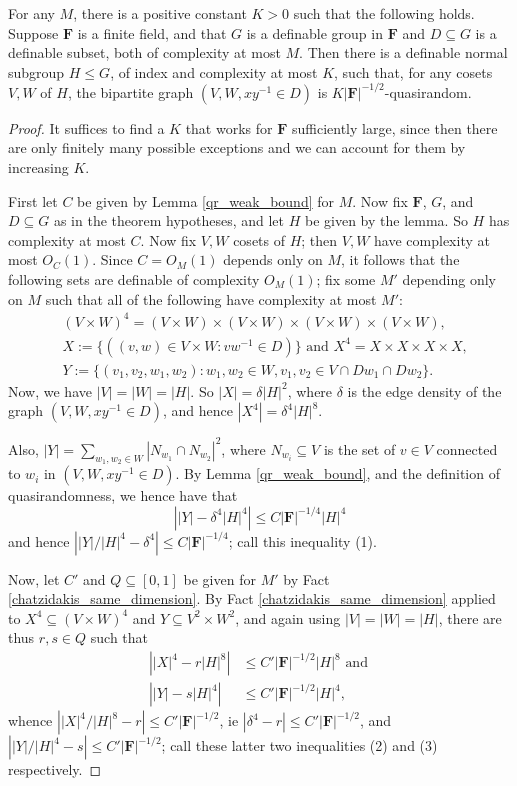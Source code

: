 \documentclass[10pt]{article}
\begin{document}
{\begin{theorem}\label{main_theorem}
    For any $M$, there is a positive constant $K>0$ such that the following holds. Suppose $\mathbf{F}$ is a finite field, and that $G$ is a definable group in $\mathbf{F}$ and $D\subseteq G$ is a definable subset, both of complexity at most $M$. Then there is a definable normal subgroup $H\leqslant G$, of index and complexity at most $K$, such that, for any cosets $V,W$ of $H$, the bipartite graph $(V,W,xy^{-1}\in D)$ is $K|\mathbf{F}|^{-1/2}$-quasirandom.
\end{theorem}
\begin{proof}
    It suffices to find a $K$ that works for $\mathbf{F}$ sufficiently large, since then there are only finitely many possible exceptions and we can account for them by increasing $K$.

    First let $C$ be given by Lemma \ref{qr_weak_bound} for $M$. Now fix $\mathbf{F}$, $G$, and $D\subseteq G$ as in the theorem hypotheses, and let $H$ be given by the lemma. So $H$ has complexity at most $C$. Now fix $V,W$ cosets of $H$; then $V,W$ have complexity at most $O_C(1)$. Since $C=O_M(1)$ depends only on $M$, it follows that the following sets are definable of complexity $O_M(1)$; fix some $M'$ depending only on $M$ such that all of the following have complexity at most $M'$:
    \begin{align*}
        &(V\times W)^4=(V\times W)\times (V\times W)\times (V\times W)\times (V\times W), \\
        &X:=\{((v,w)\in V\times W:vw^{-1}\in D)\}\text{ and }X^4=X\times X\times X\times X,\\
        &Y:=\{(v_1,v_2,w_1,w_2):w_1,w_2\in W,v_1,v_2\in V\cap Dw_1\cap Dw_2\}.
    \end{align*} Now, we have $|V|=|W|=|H|$. So $|X|=\delta|H|^2$, where $\delta$ is the edge density of the graph $(V,W,xy^{-1}\in D)$, and hence $|X^4|=\delta^4|H|^8$.
    
    Also, $|Y|=\sum_{w_1,w_2\in W}|N_{w_1}\cap N_{w_2}|^2$, where $N_{w_i}\subseteq V$ is the set of $v\in V$ connected to $w_i$ in $(V,W,xy^{-1}\in D)$. By Lemma \ref{qr_weak_bound}, and the definition of quasirandomness, we hence have that $$\left||Y|-\delta^4|H|^4\right|\leqslant C|\mathbf{F}|^{-1/4}|H|^4$$ and hence $\left||Y|/|H|^4-\delta^4\right|\leqslant C|\mathbf{F}|^{-1/4}$; call this inequality (1).

    Now, let $C'$ and $Q\subseteq[0,1]$ be given for $M'$ by Fact \ref{chatzidakis_same_dimension}. By Fact \ref{chatzidakis_same_dimension} applied to $X^4\subseteq (V\times W)^4$ and $Y\subseteq V^2\times W^2$, and again using $|V|=|W|=|H|$, there are thus $r,s\in Q$ such that \begin{align*}
        \left||X|^4-r|H|^8\right|&\leqslant C'|\mathbf{F}|^{-1/2}|H|^8\text{ and}\ \\
        \left||Y|-s|H|^4\right|&\leqslant C'|\mathbf{F}|^{-1/2}|H|^4,
    \end{align*} whence $\left||X|^4/|H|^8-r\right|\leqslant C'|\mathbf{F}|^{-1/2}$, ie $|\delta^4-r|\leqslant C'|\mathbf{F}|^{-1/2}$, and $\left||Y|/|H|^4-s\right|\leqslant C'|\mathbf{F}|^{-1/2}$; call these latter two inequalities (2) and (3) respectively.


\end{proof}}
\end{document}
